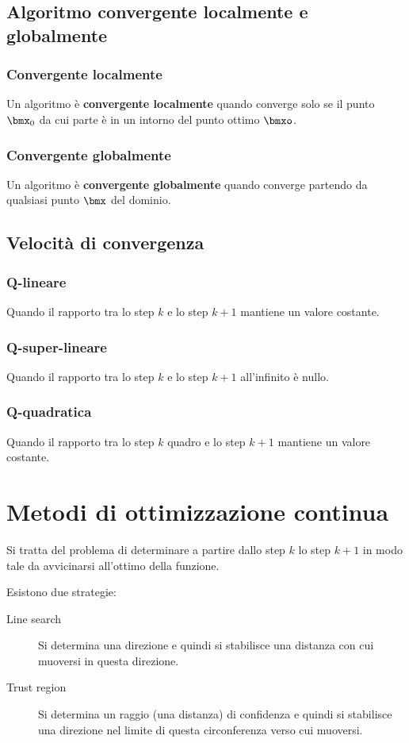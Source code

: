 \documentclass[\main/main.tex]{subfiles}
\begin{document}
\section{Algoritmo convergente localmente e globalmente}
\subsection{Convergente localmente}
Un algoritmo è \textbf{convergente localmente} quando converge solo se il punto \(\bmx_0\) da cui parte è in un intorno del punto ottimo \(\bmxo \).
\subsection{Convergente globalmente}
Un algoritmo è \textbf{convergente globalmente} quando converge partendo da qualsiasi punto \(\bmx \) del dominio.

\section{Velocità di convergenza}
\subsection{Q-lineare}
Quando il rapporto tra lo step \(k\) e lo step \(k+1\) mantiene un valore costante.

\subsection{Q-super-lineare}
Quando il rapporto tra lo step \(k\) e lo step \(k+1\) all'infinito è nullo.

\subsection{Q-quadratica}
Quando il rapporto tra lo step \(k\) quadro e lo step \(k+1\) mantiene un valore costante.

\chapter{Metodi di ottimizzazione continua}
Si tratta del problema di determinare a partire dallo step \(k\) lo step \(k+1\) in modo tale da avvicinarsi all'ottimo della funzione.

Esistono due strategie:

\begin{description}
    \item[Line search] Si determina una direzione e quindi si stabilisce una distanza con cui muoversi in questa direzione.
    \item[Trust region] Si determina un raggio (una distanza) di confidenza e quindi si stabilisce una direzione nel limite di questa circonferenza verso cui muoversi.
\end{description}
\end{document}
